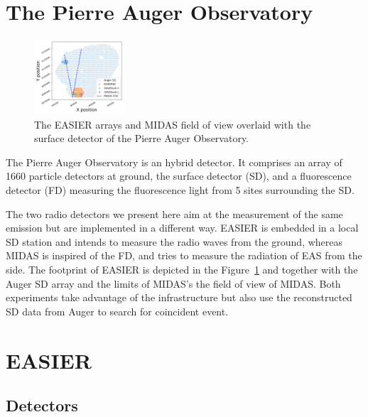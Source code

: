 \documentclass{PoS}
\begin{document}
\section{The Pierre Auger Observatory}
\begin{figure}
  \begin{center}
	\includegraphics[width=0.3\textwidth]{layoutGHz.png}
	  \end{center}
  \caption{The EASIER arrays and MIDAS field of view overlaid with the surface detector of the Pierre Auger Observatory.}
\label{fig:ghzlayout}
\end{figure}
The Pierre Auger Observatory is an hybrid detector. It  comprises an array of 1660 particle detectors at ground, the surface detector (SD), and a fluorescence detector (FD) measuring the fluorescence light from 5 sites surrounding the SD.

The two radio detectors we present here aim at the measurement of the same emission but are implemented in a different way. EASIER is embedded in a local SD station and intends to measure the radio waves from the ground, whereas MIDAS is inspired of the FD, and tries to measure the radiation of EAS from the side. The footprint of EASIER is depicted in the Figure~\ref{fig:ghzlayout} and together with the Auger SD array and the limits of MIDAS's the field of view of MIDAS. Both experiments take advantage of the infrastructure but also use the reconstructed SD data from Auger to search for coincident event. 

%

\section{EASIER}
\subsection{Detectors}
\end{document}
